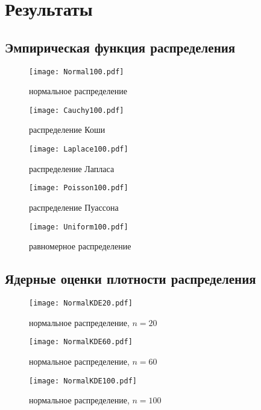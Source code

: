 \documentclass{article}
\begin{document}
\section {Результаты} 

\subsection{Эмпирическая функция распределения}
	\begin{figure}[H]
	\centering
	{\texttt{[image: Normal100.pdf]}}
		\caption{нормальное распределение} 
		\label{fig:normal}
	\end{figure}

\begin{figure}[H]
	{\texttt{[image: Cauchy100.pdf]}}
		\caption{распределение Коши} 
		\label{fig:normal}
	\end{figure}

\begin{figure}[H]
	{\texttt{[image: Laplace100.pdf]}}
		\caption{распределение Лапласа} 
		\label{fig:normal}
	\end{figure}
	
\begin{figure}[H]
	{\texttt{[image: Poisson100.pdf]}}
		\caption{распределение Пуассона} 
		\label{fig:normal}
	\end{figure}
	
\begin{figure}[H]
	{\texttt{[image: Uniform100.pdf]}}
		\caption{равномерное распределение} 
		\label{fig:normal}
	\end{figure}
	
\subsection{Ядерные оценки плотности распределения}
\begin{figure}[H]
	{\texttt{[image: NormalKDE20.pdf]}}
		\caption{нормальное распределение, $n=20$} 
		\label{fig:normal}
	\end{figure}
	
\begin{figure}[H]
	{\texttt{[image: NormalKDE60.pdf]}}
		\caption{нормальное распределение, $n=60$} 
		\label{fig:normal}
	\end{figure}
		
\begin{figure}[H]
	{\texttt{[image: NormalKDE100.pdf]}}
		\caption{нормальное распределение, $n=100$} 
		\label{fig:normal}
	\end{figure}
\end{document}
